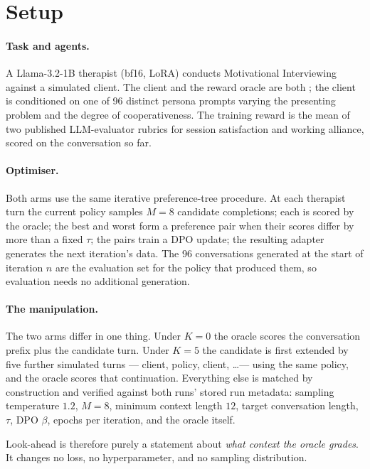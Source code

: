 \section{Setup}
\label{sec:setup}

\paragraph{Task and agents.} A Llama-3.2-1B therapist (bf16, LoRA) conducts Motivational
Interviewing against a simulated client. The client and the reward oracle are both
\primaryjudge{}; the client is conditioned on one of 96 distinct persona prompts varying the
presenting problem and the degree of cooperativeness. The training reward is the mean of two
published LLM-evaluator rubrics for session satisfaction and working alliance, scored on the
conversation so far.

\paragraph{Optimiser.} Both arms use the same iterative preference-tree procedure. At each
therapist turn the current policy samples $M{=}8$ candidate completions; each is scored by the
oracle; the best and worst form a preference pair when their scores differ by more than a fixed
$\tau$; the pairs train a DPO update; the resulting adapter generates the next iteration's data.
The 96 conversations generated at the start of iteration $n$ are the evaluation set for the policy
that produced them, so evaluation needs no additional generation.

\paragraph{The manipulation.} The two arms differ in one thing. Under $K{=}0$ the oracle scores
the conversation prefix plus the candidate turn. Under $K{=}5$ the candidate is first extended by
five further simulated turns --- client, policy, client, \ldots --- using the same policy, and the
oracle scores that continuation. Everything else is matched by construction and verified against
both runs' stored run metadata: sampling temperature $1.2$, $M{=}8$, minimum context length $12$,
target conversation length, $\tau$, DPO $\beta$, epochs per iteration, and the oracle itself.

Look-ahead is therefore purely a statement about \emph{what context the oracle grades}. It changes
no loss, no hyperparameter, and no sampling distribution.

